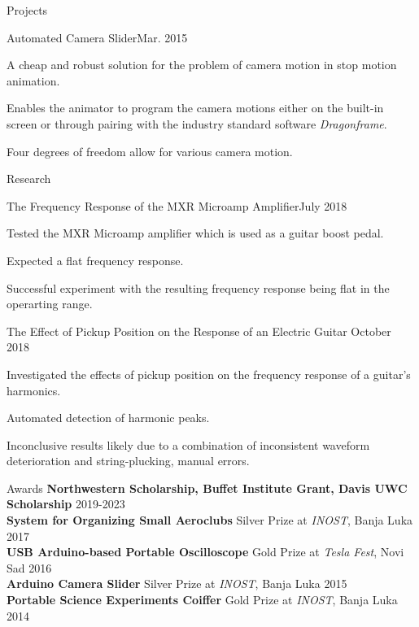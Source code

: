 \documentclass{resume}
\begin{document}
\begin{rSection}{Projects}
    \begin{rSubsection}{Automated Camera Slider}{Mar. 2015}{}{}
        \item A cheap and robust solution for the problem of camera motion in
            stop motion animation.
        \item Enables the animator to program the camera motions either on the
            built-in screen or through pairing with the industry standard
            software \textit{Dragonframe}.
        \item Four degrees of freedom allow for various camera motion.
    \end{rSubsection}
\end{rSection}

\begin{rSection}{Research}
    \begin{rSubsection}
        {The Frequency Response of the MXR Microamp Amplifier}{July 2018}
        {}{}
        \item Tested the MXR Microamp amplifier which is used as a guitar
            boost pedal.
        \item Expected a flat frequency response.
        \item Successful experiment with the resulting frequency response being
            flat in the operarting range.
    \end{rSubsection}

    \begin{rSubsection}
        {The Effect of Pickup Position on the Response of an Electric Guitar}
        {October 2018}{}{}
        \item Investigated the effects of pickup position on the frequency
            response of a guitar's harmonics.
        \item Automated detection of harmonic peaks.
        \item Inconclusive results likely due to a combination of inconsistent
            waveform deterioration and string-plucking, manual errors.
    \end{rSubsection}
\end{rSection}

\begin{rSection}{Awards}
    {\bf Northwestern Scholarship, Buffet Institute Grant, Davis UWC Scholarship}
    \hfill {2019-2023} \\
    {\bf System for Organizing Small Aeroclubs}
    \hfill {Silver Prize at \textit{INOST}, Banja Luka 2017} \\
    {\bf USB Arduino-based Portable Oscilloscope}
        \hfill {Gold Prize at \textit{Tesla Fest}, Novi Sad 2016} \\
    {\bf Arduino Camera Slider}
        \hfill {Silver Prize at \textit{INOST}, Banja Luka 2015} \\
    {\bf Portable Science Experiments Coiffer}
        \hfill {Gold Prize at \textit{INOST}, Banja Luka 2014}
\end{rSection}
\end{document}
